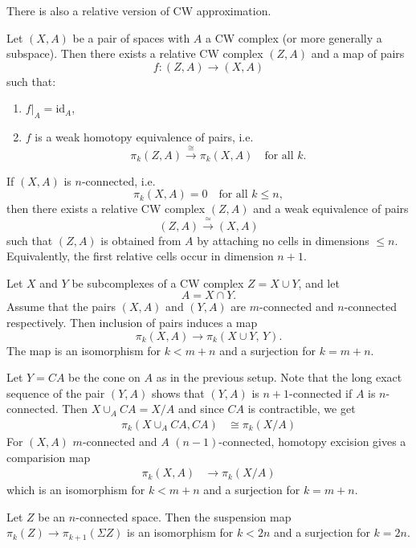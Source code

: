 \documentclass[12pt]{article}
\begin{document}
There is also a relative version of CW approximation.  

\begin{theorem}
Let $(X,A)$ be a pair of spaces with $A$ a CW complex (or more generally a
subspace). Then there exists a relative CW complex $(Z,A)$ and a map of pairs
\[
f:(Z,A)\longrightarrow (X,A)
\]
such that:
\begin{enumerate}
    \item $f|_A = \mathrm{id}_A$,
    \item $f$ is a weak homotopy equivalence of pairs, i.e.
    \[
    \pi_k(Z,A) \xrightarrow{\;\cong\;} \pi_k(X,A)
    \quad \text{for all } k.
    \]
\end{enumerate}
If $(X,A)$ is $n$-connected,
i.e.
\[
\pi_k(X,A)=0 \quad \text{for all } k\le n,
\]
then there exists a relative CW complex $(Z,A)$ and a weak equivalence of
pairs
\[
(Z,A)\xrightarrow{\;\simeq\;} (X,A)
\]
such that $(Z,A)$ is obtained from $A$ by attaching no cells in dimensions $\le n$. Equivalently, the first relative cells occur in dimension $n+1$.
\end{theorem}

\begin{theorem}
Let $X$ and $Y$ be subcomplexes of a CW complex $Z=X\cup Y$, and let
\[
A=X\cap Y.
\]
Assume that the pairs $(X,A)$ and $(Y,A)$ are $m$-connected and
$n$-connected respectively. Then inclusion of pairs induces a map
\[
\pi_k(X,A)\longrightarrow \pi_k(X\cup Y,\,Y).
\]
The map is an isomorphism for $k<m+n$ and a surjection for $k=m+n$.
\end{theorem}

\begin{corollary}
    Let $Y = CA$ be the cone on $A$ as in the previous setup. Note that the long exact sequence of the pair $(Y,A)$ shows that $(Y,A)$ is $n+1$-connected if $A$ is $n$-connected. Then $X \cup_A CA = X/A$ and since $CA$ is contractible, we get \begin{align*}
        \pi_k(X \cup_A CA, CA) & \cong \pi_k(X/A)
    \end{align*}
    For $(X,A)$ $m$-connected and $A$ $(n-1)$-connected, homotopy excision gives a comparision map \begin{align*}
    \pi_k(X,A) & \to \pi_k(X/A)
    \end{align*} which is an isomorphism for $k < m+n$ and a surjection for $k = m+n$.
\end{corollary}

\begin{corollary}
     Let $Z$ be an $n$-connected space. Then the suspension map $\pi_k(Z) \to \pi_{k+1}(\Sigma Z)$ is an isomorphism for $k < 2n$ and a surjection for $k = 2n$.
\end{corollary}
\end{document}
